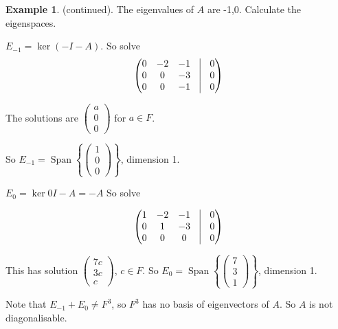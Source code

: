 \documentclass{article}
\theoremstyle{definition} \newtheorem*{definition}{Definition}
\newtheorem*{exmp}{Example} \newtheorem*{exmps}{Examples}
\DeclareMathOperator{\Span}{Span}
\begin{document}
\begin{exmp}
  (continued). The eigenvalues of $A$ are -1,0. 
  Calculate the eigenspaces.

  $E_{-1} = \ker(-I - A)$. So solve 
  \begin{align*}
    \left( 
    \begin{matrix}
      0 & -2 & -1 &\vline &  0\\
      0 & 0 & -3 &\vline &  0\\
      0 & 0 & -1 &\vline &  0
    \end{matrix}
    \right)
  \end{align*}

  The solutions are $\left( 
  \begin{matrix}
    a \\ 0 \\ 0
  \end{matrix}
  \right)$ for $a \in F$.

  So $E_{-1} =\Span\left\{ \left( 
    \begin{matrix}
        1 \\ 0 \\ 0
        \end{matrix}
        \right)\right\}$, dimension 1.

        $E_0 = \ker 0I - A =  -A$ So solve

  \begin{align*}
    \left( 
    \begin{matrix}
      1 & -2 & -1 & \vline & 0\\
      0 & 1 & -3 & \vline & 0\\
      0 & 0 & 0 & \vline & 0
    \end{matrix}
    \right)
  \end{align*}

  This has solution $\left( 
  \begin{matrix}
    7c \\ 3c \\ c
  \end{matrix}
  \right)$, $c \in F$. So $E_0 = \Span\left\{ \left( 
    \begin{matrix}
      7 \\ 3 \\ 1
    \end{matrix}
  \right) \right\}$, dimension 1.

  Note that $E_{-1} + E_0 \neq F^{3}$, so $F^3$ has no basis of 
  eigenvectors of $A$. So $A$ is not diagonalisable.\\

\end{exmp}
\end{document}
